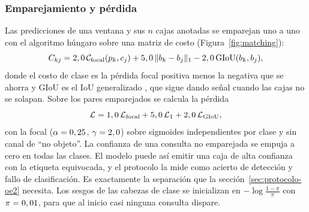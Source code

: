 \begin{figure}[htbp]
\begin{minipage}[t]{0.49\textwidth}
        \label{fig:deformable}
    \end{minipage}
\end{figure}

\subsubsection{Emparejamiento y pérdida}

Las \mQueries{} predicciones de una ventana y sus $n$ cajas anotadas se emparejan
uno a uno con el algoritmo húngaro sobre una matriz de costo
(Figura~\ref{fig:matching}):
\[
    C_{kj} = 2,0\, \mathcal{C}_{\text{focal}}(p_k, c_j)
    + 5,0\, \lVert b_k - b_j \rVert_1
    - 2,0\, \mathrm{GIoU}(b_k, b_j),
\]
donde el costo de clase es la pérdida focal \citep{lin_focal_2017} positiva
menos la negativa que se ahorra \citep{zhu_deformable_2021} y GIoU es el IoU
generalizado \citep{rezatofighi_giou_2019}, que sigue
dando señal cuando las cajas no se solapan. Sobre los pares emparejados se calcula la
pérdida
\[
    \mathcal{L} = 1,0\, \mathcal{L}_{\text{focal}}
    + 5,0\, \mathcal{L}_{1}
    + 2,0\, \mathcal{L}_{\mathrm{GIoU}},
\]
con la focal ($\alpha = 0,25$, $\gamma = 2,0$) sobre sigmoides
independientes por clase y sin canal de ``no objeto''. La confianza de una
consulta no emparejada se empuja a cero en todas las clases. El modelo puede así
emitir una caja de alta confianza con la etiqueta equivocada, y el protocolo la
mide como acierto de detección y fallo de clasificación. Es exactamente la
separación que la sección~\ref{sec:protocolo-oe2} necesita. Los sesgos de las
cabezas de clase se inicializan en $-\log\frac{1-\pi}{\pi}$ con $\pi = 0,01$,
para que al inicio casi ninguna consulta dispare.

